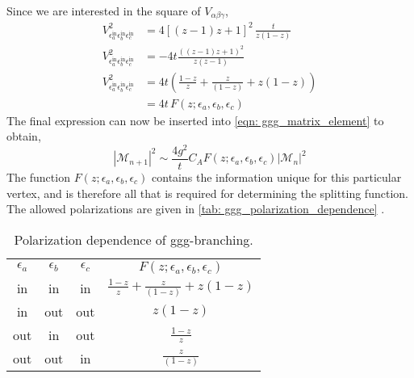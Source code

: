 \documentclass[main.tex]{subfiles}
\begin{document}
Since we are interested in the square of \(V_{\alpha\beta\gamma}\),
\begin{align}
    V_{\epsilon_a^\text{in} \epsilon_b^\text{in} \epsilon_c^\text{in}}^2 &= 4 \left[ (z-1)z+ 1
    \right]^2 \,\frac{t}{z(1-z)} \nonumber\\
    V_{\epsilon_a^\text{in} \epsilon_b^\text{in} \epsilon_c^\text{in}}^2 &= -4 t 
    \frac{((z-1)z+ 1)^2}{z(z-1)} \nonumber \\
    V_{\epsilon_a^\text{in} \epsilon_b^\text{in} \epsilon_c^\text{in}}^2 &= 4 t 
    \left( \frac{1-z}{z} + \frac{z}{(1-z)} + z(1-z) \right) \nonumber \\
    &= 4t \, F(z;\epsilon_a,\epsilon_b,\epsilon_c)
\end{align}
The final expression can now be inserted into \autoref{eqn: ggg_matrix_element} to obtain, 
\begin{equation}\label{eqn: ggg_matrix_element_ellis_5.9}
    |\mathcal{M}_{n+1}|^2 \sim \frac{4g^2}{t} C_A F(z;\epsilon_a,\epsilon_b,\epsilon_c) |\mathcal{M}_n|^2
\end{equation}
The function \(F(z;\epsilon_a,\epsilon_b,\epsilon_c)\) contains the information unique for this particular vertex, and is therefore all that is required for determining the splitting function. The allowed polarizations are given in \autoref{tab: ggg_polarization_dependence} \cite{ellis_stirling_webber_1996}.
\begin{table}[h]
    \centering
    \begin{tabular}[]{cccccc}
        \(\epsilon_a\) & \(\epsilon_b\) & \(\epsilon_c\)& \multicolumn{3}{c}{\(F(z;\epsilon_a,\epsilon_b,\epsilon_c)\)} \\
        \cmidrule(lr){1-3} \cmidrule(lr){4-6}
        in & in & in & \multicolumn{3}{c}{\(\frac{1-z}{z} + \frac{z}{(1-z)} + z(1-z)\)} \\[0.2cm]
        in & out & out & \multicolumn{3}{c}{\(z(1-z)\)} \\[0.2cm]
        out & in & out & \multicolumn{3}{c}{\(\frac{1-z}{z} \)} \\[0.2cm]
        out & out & in & \multicolumn{3}{c}{\(\frac{z}{(1-z)} \)} \\[0.2cm]
        \bottomrule
    \end{tabular}
    \caption{Polarization dependence of ggg-branching.}
    \label{tab: ggg_polarization_dependence}
\end{table}
\end{document}

